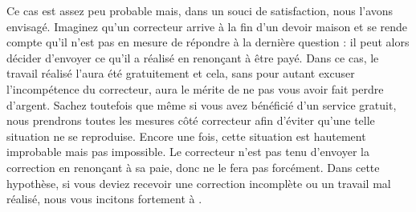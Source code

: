 ﻿Ce cas est assez peu probable mais, dans un souci de satisfaction, nous l’avons envisagé. Imaginez qu’un correcteur arrive à la fin d’un devoir maison et se rende compte qu’il n’est pas en mesure de répondre à la dernière question : il peut alors décider d’envoyer ce qu’il a réalisé en renonçant à être payé. Dans ce cas, le travail réalisé l’aura été gratuitement et cela, sans pour autant excuser l’incompétence du correcteur, aura le mérite de ne pas vous avoir fait perdre d’argent. Sachez toutefois que même si vous avez bénéficié d’un service gratuit, nous prendrons toutes les mesures côté correcteur afin d’éviter qu’une telle situation ne se reproduise. Encore une fois, cette situation est hautement improbable mais pas impossible.
Le correcteur n’est pas tenu d’envoyer la correction en renonçant à sa paie, donc ne le fera pas forcément. Dans cette hypothèse, si vous deviez recevoir une correction incomplète ou un travail mal réalisé, nous vous incitons fortement à .